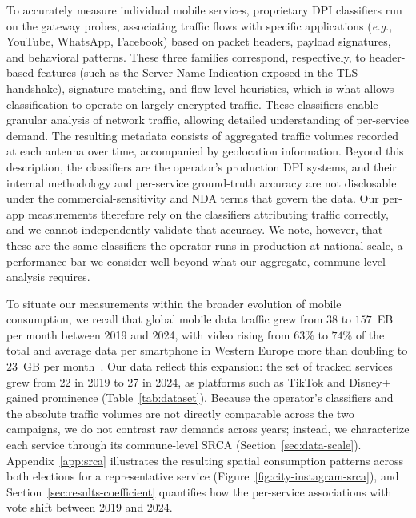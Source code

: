 \documentclass[9pt,sigconf,letterpaper]{acmart}
\newcommand{\eg}{\textit{e.g.},\xspace}
\begin{document}
To accurately measure individual mobile services, proprietary \ac{DPI} classifiers run on the gateway probes, associating traffic flows with specific applications (\eg YouTube, WhatsApp, Facebook) based on packet headers, payload signatures, and behavioral patterns. These three families correspond, respectively, to header-based features (such as the Server Name Indication exposed in the TLS handshake), signature matching, and flow-level heuristics, which is what allows classification to operate on largely encrypted traffic. These classifiers enable granular analysis of network traffic, allowing detailed understanding of per-service demand. The resulting metadata consists of aggregated traffic volumes recorded at each antenna over time, accompanied by geolocation information.
Beyond this description, the classifiers are the operator's production \ac{DPI} systems, and their internal methodology and per-service ground-truth accuracy are not disclosable under the commercial-sensitivity and \ac{NDA} terms that govern the data. 
Our per-app measurements therefore rely on the classifiers attributing traffic correctly, and we cannot independently validate that accuracy. 
We note, however, that these are the same classifiers the operator runs in production at national scale, a performance bar we consider well beyond what our aggregate, commune-level analysis requires.

To situate our measurements within the broader evolution of mobile consumption, we recall that global mobile data traffic grew from $38$ to $157$~EB per month between 2019 and 2024, with video rising from $63\%$ to $74\%$ of the total and average data per smartphone in Western Europe more than doubling to $23$~GB per month~\cite{ericsson_mobility_report_2019,ericsson_mobility_report_2024}. Our data reflect this expansion: the set of tracked services grew from 22 in 2019 to 27 in 2024, as platforms such as TikTok and Disney+ gained prominence (Table~\ref{tab:dataset}). Because the operator's classifiers and the absolute traffic volumes are not directly comparable across the two campaigns, we do not contrast raw demands across years; instead, we characterize each service through its commune-level \ac{SRCA} (Section~\ref{sec:data-scale}). Appendix~\ref{app:srca} illustrates the resulting spatial consumption patterns across both elections for a representative service (Figure~\ref{fig:city-instagram-srca}), and Section~\ref{sec:results-coefficient} quantifies how the per-service associations with vote shift between 2019 and 2024.
\end{document}
